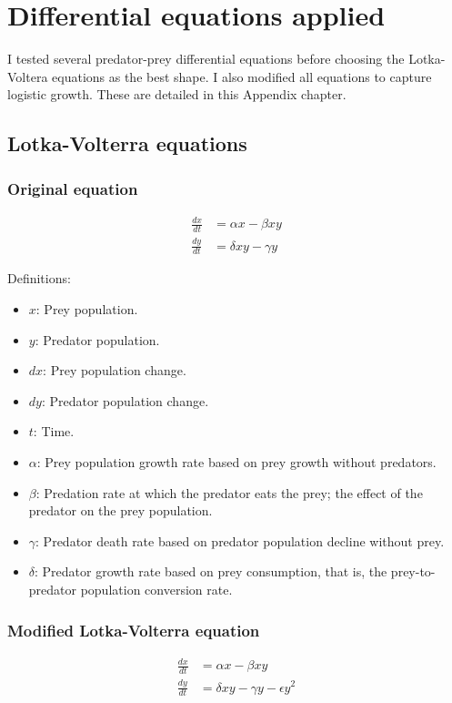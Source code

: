 \chapter{Differential equations applied}
\label{chapter:differential_equations}
I tested several predator-prey differential equations before choosing the Lotka-Voltera equations as the best shape. I also modified all equations to capture logistic growth. These are detailed in this Appendix chapter.

\section{Lotka-Volterra equations}
\subsection{Original equation}
\begin{equation*}
\begin{split}
\frac{dx}{dt} &= \alpha x - \beta x y \\
\frac{dy}{dt} &= \delta x y -\gamma y
\end{split}
\end{equation*}

Definitions:
\begin{itemize}
\item $x$: Prey population.
\item $y$: Predator population.
\item $dx$: Prey population change.
\item $dy$: Predator population change.
\item $t$: Time.
\item $\alpha$: Prey population growth rate based on prey growth without predators.
\item $\beta$: Predation rate at which the predator eats the prey; the effect of the predator on the prey population.
\item $\gamma$: Predator death rate based on predator population decline without prey.
\item $\delta$: Predator growth rate based on prey consumption, that is, the prey-to-predator population conversion rate.
\end{itemize}

\subsection{Modified Lotka-Volterra equation}
\begin{equation*}
\begin{split}
\frac{dx}{dt} &= \alpha x - \beta x y \\
\frac{dy}{dt} &= \delta x y -\gamma y - \epsilon y^2
\end{split}
\end{equation*}


